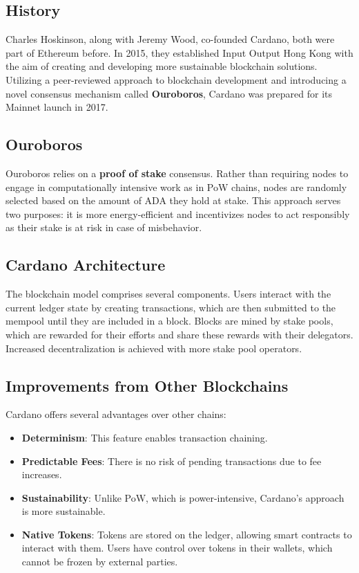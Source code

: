 \subsection{History} \label{sec:overwiew}

Charles Hoskinson, along with Jeremy Wood, co-founded Cardano, both were part of Ethereum before. In 2015, they established Input Output Hong Kong with the aim of creating and developing more sustainable blockchain solutions. Utilizing a peer-reviewed approach to blockchain development and introducing a novel consensus mechanism called \textbf{Ouroboros}, Cardano was prepared for its Mainnet launch in 2017.

\subsection{Ouroboros}

Ouroboros relies on a \textbf{proof of stake} consensus. Rather than requiring nodes to engage in computationally intensive work as in PoW chains, nodes are randomly selected based on the amount of ADA they hold at stake. This approach serves two purposes: it is more energy-efficient and incentivizes nodes to act responsibly as their stake is at risk in case of misbehavior.

\subsection{Cardano Architecture}

The blockchain model comprises several components. Users interact with the current ledger state by creating transactions, which are then submitted to the mempool until they are included in a block. Blocks are mined by stake pools, which are rewarded for their efforts and share these rewards with their delegators. Increased decentralization is achieved with more stake pool operators.

\subsection{Improvements from Other Blockchains}

Cardano offers several advantages over other chains:

\begin{itemize}
\item \textbf{Determinism}: This feature enables transaction chaining.
\item \textbf{Predictable Fees}: There is no risk of pending transactions due to fee increases.
\item \textbf{Sustainability}: Unlike PoW, which is power-intensive, Cardano's approach is more sustainable.
\item \textbf{Native Tokens}: Tokens are stored on the ledger, allowing smart contracts to interact with them. Users have control over tokens in their wallets, which cannot be frozen by external parties.
\end{itemize}

